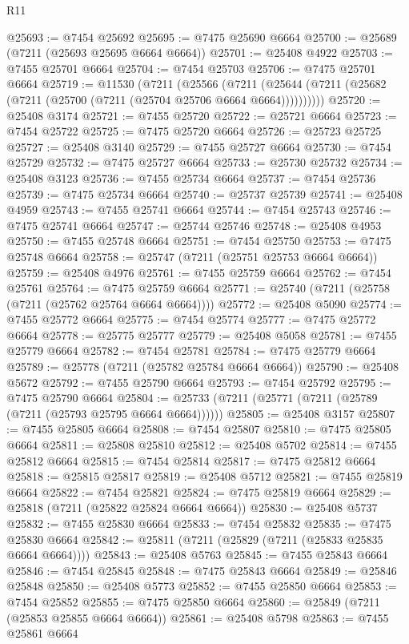 \begin{lexlean}{R11}
\begin{coremodule}
{{{{{{{{{{{{{{{{{{{{{{{{{{{{{{{{{{{{{{{{{{{{{{{{{{{{{{{{{{{{{{{{{{{{{{{{{{{{{{{{{{@25693 := @7454 @25692
@25695 := @7475 @25690 @6664
@25700 := @25689 (@7211 (@25693 @25695 @6664 @6664))
@25701 := @25408 @4922
@25703 := @7455 @25701 @6664
@25704 := @7454 @25703
@25706 := @7475 @25701 @6664
@25719 := @11530
    (@7211
      (@25566
        (@7211 (@25644 (@7211 (@25682 (@7211 (@25700 (@7211 (@25704 @25706 @6664 @6664))))))))))
@25720 := @25408 @3174
@25721 := @7455 @25720
@25722 := @25721 @6664
@25723 := @7454 @25722
@25725 := @7475 @25720 @6664
@25726 := @25723 @25725
@25727 := @25408 @3140
@25729 := @7455 @25727 @6664
@25730 := @7454 @25729
@25732 := @7475 @25727 @6664
@25733 := @25730 @25732
@25734 := @25408 @3123
@25736 := @7455 @25734 @6664
@25737 := @7454 @25736
@25739 := @7475 @25734 @6664
@25740 := @25737 @25739
@25741 := @25408 @4959
@25743 := @7455 @25741 @6664
@25744 := @7454 @25743
@25746 := @7475 @25741 @6664
@25747 := @25744 @25746
@25748 := @25408 @4953
@25750 := @7455 @25748 @6664
@25751 := @7454 @25750
@25753 := @7475 @25748 @6664
@25758 := @25747 (@7211 (@25751 @25753 @6664 @6664))
@25759 := @25408 @4976
@25761 := @7455 @25759 @6664
@25762 := @7454 @25761
@25764 := @7475 @25759 @6664
@25771 := @25740 (@7211 (@25758 (@7211 (@25762 @25764 @6664 @6664))))
@25772 := @25408 @5090
@25774 := @7455 @25772 @6664
@25775 := @7454 @25774
@25777 := @7475 @25772 @6664
@25778 := @25775 @25777
@25779 := @25408 @5058
@25781 := @7455 @25779 @6664
@25782 := @7454 @25781
@25784 := @7475 @25779 @6664
@25789 := @25778 (@7211 (@25782 @25784 @6664 @6664))
@25790 := @25408 @5672
@25792 := @7455 @25790 @6664
@25793 := @7454 @25792
@25795 := @7475 @25790 @6664
@25804 := @25733 (@7211 (@25771 (@7211 (@25789 (@7211 (@25793 @25795 @6664 @6664))))))
@25805 := @25408 @3157
@25807 := @7455 @25805 @6664
@25808 := @7454 @25807
@25810 := @7475 @25805 @6664
@25811 := @25808 @25810
@25812 := @25408 @5702
@25814 := @7455 @25812 @6664
@25815 := @7454 @25814
@25817 := @7475 @25812 @6664
@25818 := @25815 @25817
@25819 := @25408 @5712
@25821 := @7455 @25819 @6664
@25822 := @7454 @25821
@25824 := @7475 @25819 @6664
@25829 := @25818 (@7211 (@25822 @25824 @6664 @6664))
@25830 := @25408 @5737
@25832 := @7455 @25830 @6664
@25833 := @7454 @25832
@25835 := @7475 @25830 @6664
@25842 := @25811 (@7211 (@25829 (@7211 (@25833 @25835 @6664 @6664))))
@25843 := @25408 @5763
@25845 := @7455 @25843 @6664
@25846 := @7454 @25845
@25848 := @7475 @25843 @6664
@25849 := @25846 @25848
@25850 := @25408 @5773
@25852 := @7455 @25850 @6664
@25853 := @7454 @25852
@25855 := @7475 @25850 @6664
@25860 := @25849 (@7211 (@25853 @25855 @6664 @6664))
@25861 := @25408 @5798
@25863 := @7455 @25861 @6664
}}}}}}}}}}}}}}}}}}}}}}}}}}}}}}}}}}}}}}}}}}}}}}}}}}}}}}}}}}}}}}}}}}}}}}}}}}}}}}}}}}
\end{coremodule}
\end{lexlean}
